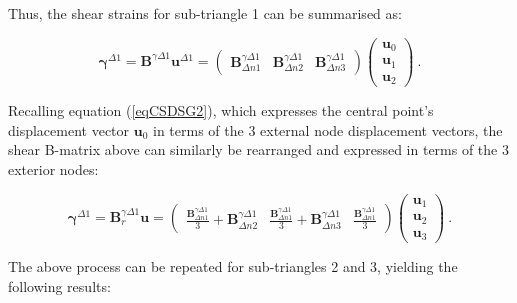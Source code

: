 Thus, the shear strains for sub-triangle 1 can be summarised as:

  \begin{equation} 
\boldsymbol{\gamma}^{\Delta 1} =
\mathbf{B}^{\gamma\Delta 1}
\mathbf{u}^{\Delta 1}
=
\begin{pmatrix}
\mathbf{B}_{\Delta n1}^{\gamma\Delta 1} & \mathbf{B}_{\Delta n2}^{\gamma\Delta 1} & \mathbf{B}_{\Delta n3}^{\gamma\Delta 1}
\end{pmatrix}
\begin{pmatrix}
\mathbf{u}_0 \\
\mathbf{u}_1 \\
\mathbf{u}_2
\end{pmatrix}
\label{eqCSDSG7}\ .
\end{equation}

Recalling equation (\ref{eqCSDSG2}), which expresses the central point's displacement vector $\mathbf{u}_0$ in terms of the 3 external node displacement vectors, the shear B-matrix above can similarly be rearranged and expressed in terms of the 3 exterior nodes:

  \begin{equation} 
\boldsymbol{\gamma}^{\Delta 1} =
\mathbf{B}_r^{\gamma\Delta 1}
\mathbf{u}
=
\begin{pmatrix}
\frac{\mathbf{B}_{\Delta n1}^{\gamma\Delta 1}}{3} + \mathbf{B}_{\Delta n2}^{\gamma\Delta 1} & \frac{\mathbf{B}_{\Delta n1}^{\gamma\Delta 1}}{3} + \mathbf{B}_{\Delta n3}^{\gamma\Delta 1} & \frac{\mathbf{B}_{\Delta n1}^{\gamma\Delta 1}}{3}
\end{pmatrix}
\begin{pmatrix}
\mathbf{u}_1 \\
\mathbf{u}_2 \\
\mathbf{u}_3
\end{pmatrix}
\label{eqCSDSG8}\ .
\end{equation}

The above process can be repeated for sub-triangles 2 and 3, yielding the following results:

